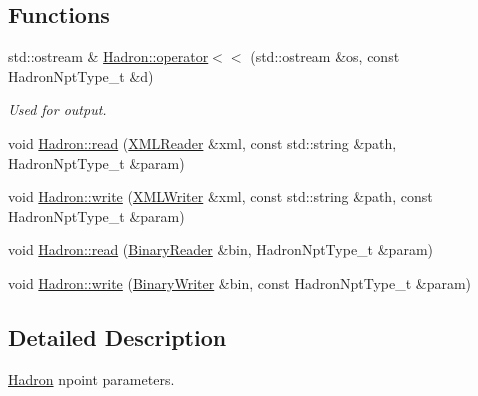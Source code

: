 \subsection*{Functions}
\begin{DoxyCompactItemize}
\item 
std\+::ostream \& \mbox{\hyperlink{namespaceHadron_ae2a5c7a5ffdda238337fd194679743a6}{Hadron\+::operator$<$$<$}} (std\+::ostream \&os, const Hadron\+Npt\+Type\+\_\+t \&d)
\begin{DoxyCompactList}\small\item\em Used for output. \end{DoxyCompactList}\item 
void \mbox{\hyperlink{namespaceHadron_ae9e95e7c9b97a878e77c48ea5619a53a}{Hadron\+::read}} (\mbox{\hyperlink{classADATXML_1_1XMLReader}{X\+M\+L\+Reader}} \&xml, const std\+::string \&path, Hadron\+Npt\+Type\+\_\+t \&param)
\item 
void \mbox{\hyperlink{namespaceHadron_a3ba652c4917e69b9056f2dd7621483df}{Hadron\+::write}} (\mbox{\hyperlink{classADATXML_1_1XMLWriter}{X\+M\+L\+Writer}} \&xml, const std\+::string \&path, const Hadron\+Npt\+Type\+\_\+t \&param)
\item 
void \mbox{\hyperlink{namespaceHadron_a7f12085b340a6e0bfb52b3d920cfeb1e}{Hadron\+::read}} (\mbox{\hyperlink{classADATIO_1_1BinaryReader}{Binary\+Reader}} \&bin, Hadron\+Npt\+Type\+\_\+t \&param)
\item 
void \mbox{\hyperlink{namespaceHadron_a0051134178fb8346e89720a478b8a8f1}{Hadron\+::write}} (\mbox{\hyperlink{classADATIO_1_1BinaryWriter}{Binary\+Writer}} \&bin, const Hadron\+Npt\+Type\+\_\+t \&param)
\end{DoxyCompactItemize}


\subsection{Detailed Description}
\mbox{\hyperlink{namespaceHadron}{Hadron}} npoint parameters. 

